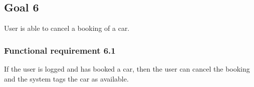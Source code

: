 \subsection{Goal 6}
User is able to cancel a booking of a car.

\setcounter{secnumdepth}{3}
\subsubsection{Functional requirement 6.1}
If the user is logged and has booked a car, then the user can cancel the booking and the system tags the car as available.
